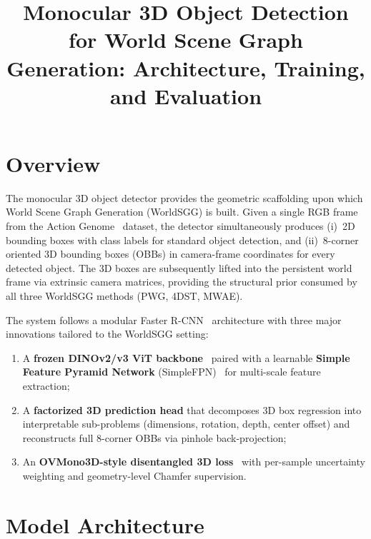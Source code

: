 \documentclass[runningheads]{llncs}
\begin{document}
\title{Monocular 3D Object Detection for World Scene Graph Generation: Architecture, Training, and Evaluation}

\maketitle


\section{Overview}
\label{sec:mono3d_overview}

The monocular 3D object detector provides the geometric scaffolding upon which World Scene Graph Generation (WorldSGG) is built.  Given a single RGB frame from the Action Genome~\cite{ji2020action} dataset, the detector simultaneously produces (i)~2D bounding boxes with class labels for standard object detection, and (ii)~8-corner oriented 3D bounding boxes (OBBs) in camera-frame coordinates for every detected object.  The 3D boxes are subsequently lifted into the persistent world frame via extrinsic camera matrices, providing the structural prior consumed by all three WorldSGG methods (PWG, 4DST, MWAE).

The system follows a modular Faster R-CNN~\cite{ren2015faster} architecture with three major innovations tailored to the WorldSGG setting:
\begin{enumerate}
    \item A \textbf{frozen DINOv2/v3 ViT backbone}~\cite{oquab2023dinov2} paired with a learnable \textbf{Simple Feature Pyramid Network} (SimpleFPN)~\cite{li2022exploring} for multi-scale feature extraction;
    \item A \textbf{factorized 3D prediction head} that decomposes 3D box regression into interpretable sub-problems (dimensions, rotation, depth, center offset) and reconstructs full 8-corner OBBs via pinhole back-projection;
    \item An \textbf{OVMono3D-style disentangled 3D loss}~\cite{zhang2023ovmono3d} with per-sample uncertainty weighting and geometry-level Chamfer supervision.
\end{enumerate}


\section{Model Architecture}
\label{sec:mono3d_architecture}
\end{document}
